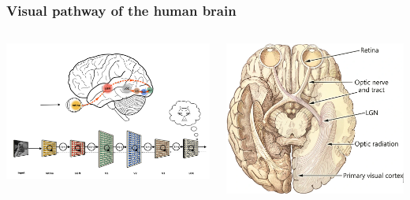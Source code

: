 \documentclass[12pt, aspectratio = 169]{beamer}
\newcommand{\backupbegin}{
	\newcounter{finalframe}
	\setcounter{finalframe}{\value{framenumber}}
}
\newcommand{\backupend}{
	\setcounter{framenumber}{\value{finalframe}}
}
\begin{document}
\begin{frame}
	\frametitle{Visual pathway of the human brain}
\begin{columns}
	\begin{minipage}[t]{\linewidth}
		\includegraphics[width=1\linewidth]{visual_stream}
	\end{minipage}%
	\begin{minipage}[t]{\linewidth}
		\includegraphics[width=1\linewidth]{brain_visual_pathway}
	\end{minipage}
\end{columns}
\end{frame}

\end{document}
